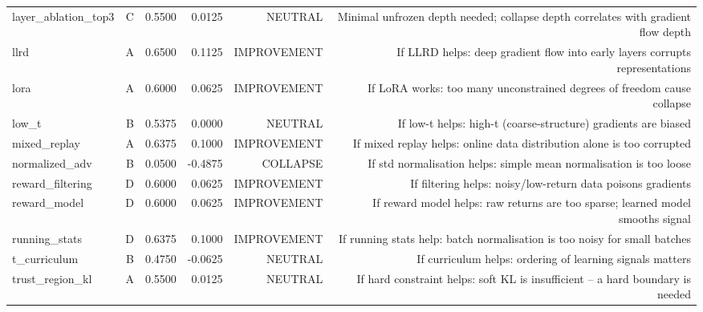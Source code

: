 \begin{table}[htbp]
\begin{tabular}{lrrrrr}
layer\_ablation\_top3 & C & 0.5500 & 0.0125 & NEUTRAL & Minimal unfrozen depth needed; collapse depth correlates with gradient flow depth \\
llrd & A & 0.6500 & 0.1125 & IMPROVEMENT & If LLRD helps: deep gradient flow into early layers corrupts representations \\
lora & A & 0.6000 & 0.0625 & IMPROVEMENT & If LoRA works: too many unconstrained degrees of freedom cause collapse \\
low\_t & B & 0.5375 & 0.0000 & NEUTRAL & If low-t helps: high-t (coarse-structure) gradients are biased \\
mixed\_replay & A & 0.6375 & 0.1000 & IMPROVEMENT & If mixed replay helps: online data distribution alone is too corrupted \\
normalized\_adv & B & 0.0500 & -0.4875 & COLLAPSE & If std normalisation helps: simple mean normalisation is too loose \\
reward\_filtering & D & 0.6000 & 0.0625 & IMPROVEMENT & If filtering helps: noisy/low-return data poisons gradients \\
reward\_model & D & 0.6000 & 0.0625 & IMPROVEMENT & If reward model helps: raw returns are too sparse; learned model smooths signal \\
running\_stats & D & 0.6375 & 0.1000 & IMPROVEMENT & If running stats help: batch normalisation is too noisy for small batches \\
t\_curriculum & B & 0.4750 & -0.0625 & NEUTRAL & If curriculum helps: ordering of learning signals matters \\
trust\_region\_kl & A & 0.5500 & 0.0125 & NEUTRAL & If hard constraint helps: soft KL is insufficient -- a hard boundary is needed \\
\bottomrule
\end{tabular}
\end{table}